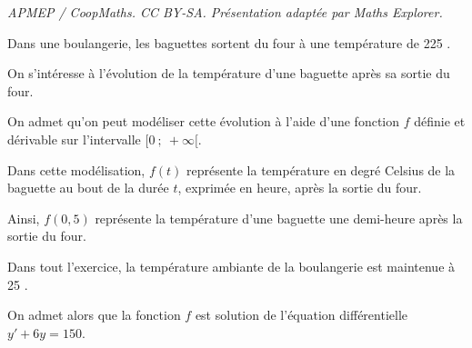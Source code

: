 \documentclass[10pt]{article}
\begin{document}
\noindent\textit{APMEP / CoopMaths. CC BY-SA. Présentation adaptée par Maths Explorer.}\par\medskip
\medskip


\medskip

Dans une boulangerie, les baguettes sortent du four à une température de 225 \textcelsius.

On s'intéresse à l'évolution de la température d'une baguette après sa sortie du four.

On admet qu'on peut modéliser cette évolution à l'aide d'une fonction $f$ définie et dérivable sur l'intervalle $[0~;~+\infty[$.

 Dans cette modélisation, $f(t)$ représente la température en degré Celsius de la baguette au bout de la durée $t$, exprimée en heure, après la sortie du four.
 
Ainsi, $f(0,5)$ représente la température d'une baguette une demi-heure après la sortie du four.

Dans tout l'exercice, la température ambiante de la boulangerie est maintenue à 25 \textcelsius.

On admet alors que la fonction $f$ est solution de l'équation différentielle $y'+ 6y = 150$.

\medskip
\end{document}
